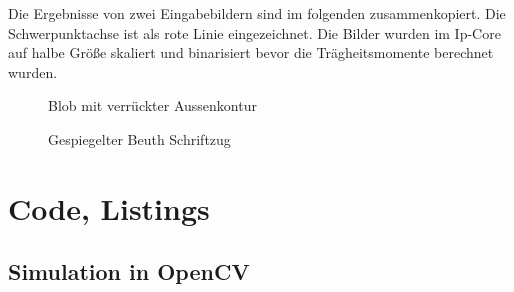 \documentclass[a4paper]{report}
\begin{document}
Die Ergebnisse von zwei Eingabebildern sind im folgenden zusammenkopiert. Die Schwerpunktachse ist als rote Linie eingezeichnet. Die Bilder wurden im Ip-Core auf halbe Größe skaliert und binarisiert bevor die Trägheitsmomente berechnet wurden.

\begin{figure}[H]
\centering
{}
\caption{Blob mit verrückter Aussenkontur}
\label{fig:blob1}
\end{figure}

\begin{figure}[H]
\centering
{}
\caption{Gespiegelter Beuth Schriftzug}
\label{fig:blob2}
\end{figure}

\section{Code, Listings}

\subsection{Simulation in OpenCV}
\end{document}
